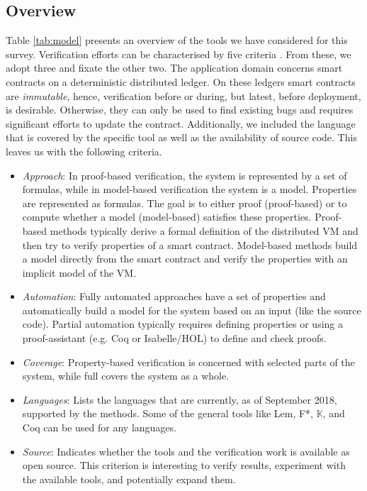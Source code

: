 \subsection{Overview}

Table \ref{tab:model} presents an overview of the tools we have considered for this survey.
Verification efforts can be characterised by five criteria \cite[173]{Huth2004}. From these, we adopt three and fixate the other two. 
The application domain concerns smart contracts on a deterministic distributed ledger.
On these ledgers smart contracts are \emph{immutable}, hence, verification before or during, but latest, before deployment, is desirable. Otherwise, they can only be used to find existing bugs and requires significant efforts to update the contract.
Additionally, we included the language that is covered by the specific tool as well as the availability of source code.
This leaves us with the following criteria.

\begin{itemize}
\item \emph{Approach}: In proof-based verification, the system is represented by a set of formulas, while in model-based verification the system is a model. Properties are represented as formulas. The goal is to either proof (proof-based) or to compute whether a model (model-based) satisfies these properties. Proof-based methods typically derive a formal definition of the distributed VM and then try to verify properties of a smart contract. Model-based methods build a model directly from the smart contract and verify the properties with an implicit model of the VM.
\item \emph{Automation}: Fully automated approaches have a set of properties and automatically build a model for the system based on an input (like the source code). Partial automation typically requires defining properties or using a proof-assistant (e.g. Coq or Isabelle/HOL) to define and check proofs.
\item \emph{Coverage}: Property-based verification is concerned with selected parts of the system, while full covers the system as a whole.
\item \emph{Languages}: Lists the languages that are currently, as of September 2018, supported by the methods. Some of the general tools like Lem, F*, $\mathbb{K}$, and Coq can be used for any languages.
\item \emph{Source}: Indicates whether the tools and the verification work is available as open source. This criterion is interesting to verify results, experiment with the available tools, and potentially expand them.
\end{itemize}

